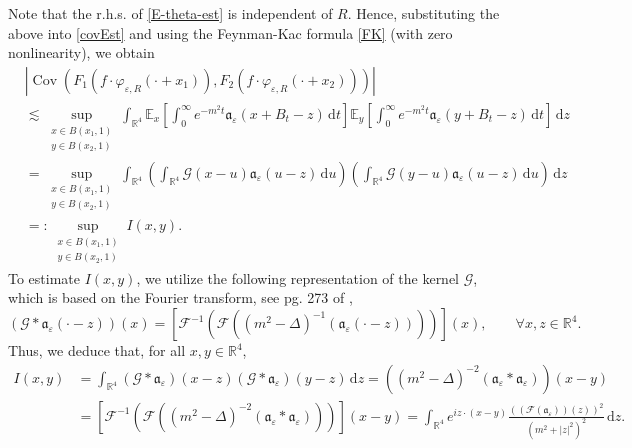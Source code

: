 \documentclass{article}
\newcommand{\backassign}{=:}
\newcommand{\mathd}{\mathrm{d}}
\newcommand{\tmop}[1]{\ensuremath{\operatorname{#1}}}
\begin{document}
%
Note that the r.h.s. of \eqref{E-theta-est} is independent of $R$. Hence, substituting the above into \eqref{covEst} and using the Feynman-Kac formula \eqref{FK} (with zero nonlinearity), we obtain 
%
\begin{align}
    & | \tmop{Cov} (F_1 (f \cdot \varphi_{\varepsilon, R} (\cdot + x_1)), F_2
    (f \cdot \varphi_{\varepsilon, R} (\cdot + x_2))) | \nonumber \\
    & \lesssim  \sup_{\substack{x \in B (x_1, 1) \\ y \in B (x_2, 1)}}  \int_{\mathbb{R}^4}
    \mathbb{E}_x \left[ \int_0^{\infty} e^{- m^2 t} \mathfrak{a}_{\varepsilon}
    (x + B_t - z) \, \mathd t \right] \mathbb{E}_y \left[ \int_0^{\infty} e^{-
    m^2 t} \mathfrak{a}_{\varepsilon} (y + B_t - z) \, \mathd t \right] \, \mathd  z \nonumber \\
    & = \sup_{\substack{x \in B (x_1, 1)\\ y \in B (x_2, 1)}}  \int_{\mathbb{R}^4} \left(
    \int_{\mathbb{R}^4} \mathcal{G}  (x - u) \mathfrak{a}_{\varepsilon} (u - z)\, \mathd u
     \right) \left( \int_{\mathbb{R}^4} \mathcal{G}  (y - u)
    \mathfrak{a}_{\varepsilon} (u - z) \, \mathd u \right) \, \mathd z \nonumber \\
    & \backassign \sup_{\substack{x \in B (x_1, 1)\\ y \in B (x_2, 1)}} I (x, y) . \label{covEst-1}
\end{align}
%
%
To estimate $I (x, y)$, we utilize the following representation of the kernel
$\mathcal{G}$, which is based on the Fourier transform, see pg. 273 of {\cite{AY2002}}, 
%
\[ (\mathcal{G} \ast \mathfrak{a}_{\varepsilon} (\cdot - z)) (x) = [\mathcal{F}^{- 1}
   (\mathcal{F} ((m^2 - \Delta)^{- 1} (\mathfrak{a}_{\varepsilon} (\cdot -
   z))))] (x), \qquad \forall x, z \in \mathbb{R}^4 . \]
Thus, we deduce that, for all $x, y \in \mathbb{R}^4$,
\begin{align}
    I (x, y) & =  \int_{\mathbb{R}^4} (\mathcal{G} \ast \mathfrak{a}_{\varepsilon}) (x
    - z) (\mathcal{G} \ast \mathfrak{a}_{\varepsilon}) (y - z) \, \mathd z  =  ((m^2 - \Delta)^{- 2} (\mathfrak{a}_{\varepsilon} \ast
    \mathfrak{a}_{\varepsilon})) (x - y) \nonumber \\
    & =  [\mathcal{F}^{- 1} (\mathcal{F} ((m^2 - \Delta)^{- 2}
    (\mathfrak{a}_{\varepsilon} \ast \mathfrak{a}_{\varepsilon})))] (x - y)  =  \int_{\mathbb{R}^4} e^{i z \cdot (x - y)} \frac{((\mathcal{F}
    (\mathfrak{a}_{\varepsilon})) (z))^2}{(m^2 + | z |^2)^2} \,  \mathd z.  \label{Kconv}
\end{align}
\end{document}
